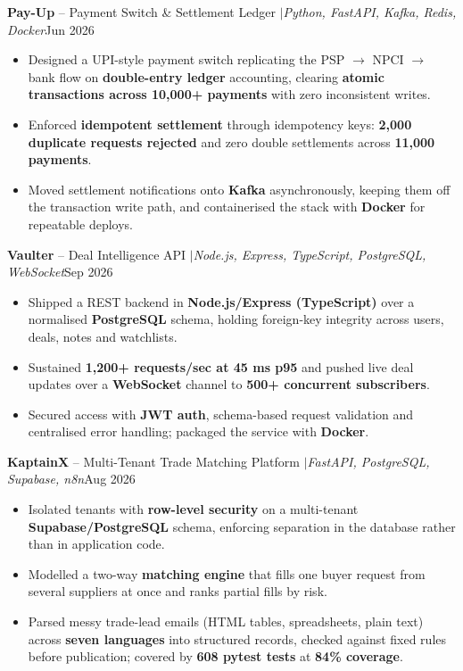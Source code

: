 \documentclass[a4paper,10pt]{article}
\newcommand{\entrygap}{\vspace{4pt}}
\newcommand{\sep}{\unskip\hspace{0.5em}$|$\hspace{0.5em}\ignorespaces}
\newlength{\entryindent}\setlength{\entryindent}{10pt}
\newcommand{\entry}[2]{\hspace*{\entryindent}#1\hfill #2\par}
\begin{document}
\entry{\textbf{Pay-Up} -- Payment Switch \& Settlement Ledger \sep \textit{Python, FastAPI, Kafka, Redis, Docker}}{Jun 2026}
\begin{itemize}
    \item Designed a UPI-style payment switch replicating the PSP $\rightarrow$ NPCI $\rightarrow$ bank flow on \textbf{double-entry ledger} accounting, clearing \textbf{atomic transactions across 10,000+ payments} with zero inconsistent writes.
    \item Enforced \textbf{idempotent settlement} through idempotency keys: \textbf{2,000 duplicate requests rejected} and zero double settlements across \textbf{11,000 payments}.
    \item Moved settlement notifications onto \textbf{Kafka} asynchronously, keeping them off the transaction write path, and containerised the stack with \textbf{Docker} for repeatable deploys.
\end{itemize}
\entrygap
\entry{\textbf{Vaulter} -- Deal Intelligence API \sep \textit{Node.js, Express, TypeScript, PostgreSQL, WebSocket}}{Sep 2026}
\begin{itemize}
    \item Shipped a REST backend in \textbf{Node.js/Express (TypeScript)} over a normalised \textbf{PostgreSQL} schema, holding foreign-key integrity across users, deals, notes and watchlists.
    \item Sustained \textbf{1,200+ requests/sec at 45 ms p95} and pushed live deal updates over a \textbf{WebSocket} channel to \textbf{500+ concurrent subscribers}.
    \item Secured access with \textbf{JWT auth}, schema-based request validation and centralised error handling; packaged the service with \textbf{Docker}.
\end{itemize}
\entrygap
\entry{\textbf{KaptainX} -- Multi-Tenant Trade Matching Platform \sep \textit{FastAPI, PostgreSQL, Supabase, n8n}}{Aug 2026}
\begin{itemize}
    \item Isolated tenants with \textbf{row-level security} on a multi-tenant \textbf{Supabase/PostgreSQL} schema, enforcing separation in the database rather than in application code.
    \item Modelled a two-way \textbf{matching engine} that fills one buyer request from several suppliers at once and ranks partial fills by risk.
    \item Parsed messy trade-lead emails (HTML tables, spreadsheets, plain text) across \textbf{seven languages} into structured records, checked against fixed rules before publication; covered by \textbf{608 pytest tests} at \textbf{84\% coverage}.
\end{itemize}
\end{document}
